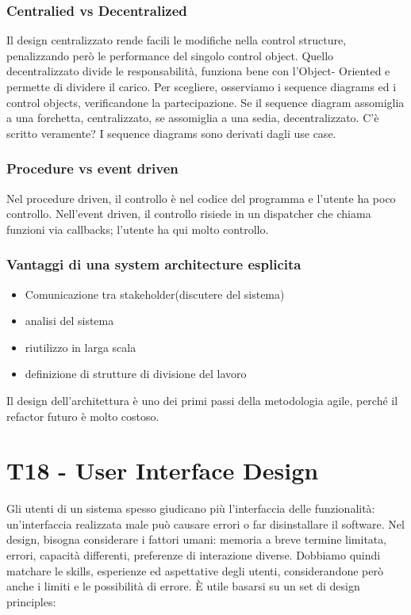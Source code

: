 \documentclass{article}
\begin{document}
\subsubsection{Centralied vs Decentralized}
Il design centralizzato rende facili le modifiche nella control structure, penalizzando però le performance
del singolo control object. Quello decentralizzato divide le responsabilità, funziona bene con l'Object-
Oriented e permette di dividere il carico. Per scegliere, osserviamo i sequence diagrams ed i control
objects, verificandone la partecipazione. Se il sequence diagram assomiglia a una forchetta, centralizzato,
se assomiglia a una sedia, decentralizzato. C'è scritto veramente? I sequence diagrams sono derivati dagli
use case.



\subsubsection{Procedure vs event driven}
Nel procedure driven, il controllo è nel codice del programma e l'utente ha poco controllo. Nell'event driven,
il controllo risiede in un dispatcher che chiama funzioni via callbacks; l'utente ha qui molto controllo.

\subsubsection{Vantaggi di una system architecture esplicita}
\begin{itemize}
    \item Comunicazione tra stakeholder(discutere del sistema)
    \item analisi del sistema
    \item riutilizzo in larga scala
    \item definizione di strutture di divisione del lavoro
\end{itemize}

Il design dell'architettura è uno dei primi passi della metodologia agile, perché il refactor futuro è molto
costoso.


\section{T18 - User Interface Design}

Gli utenti di un sistema spesso giudicano più l'interfaccia delle funzionalità: un'interfaccia realizzata male
può causare errori o far disinstallare il software. Nel design, bisogna considerare i fattori umani: memoria
a breve termine limitata, errori, capacità differenti, preferenze di interazione diverse. Dobbiamo quindi
matchare le skills, esperienze ed aspettative degli utenti,
considerandone però anche i limiti e le possibilità
di errore. È utile basarsi su un set di design principles:
\end{document}
